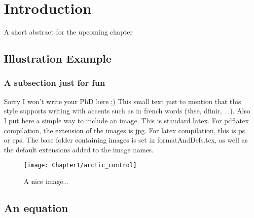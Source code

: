 \chapter{Introduction}
\label{chap:intro}
\begin{shortAbstract}
A short abstract for the upcoming chapter
\end{shortAbstract}


\section{Illustration Example}

\subsection{A subsection just for fun}

Sorry I won't write your PhD here ;) This small text just to mention that this style supports writing with accents such as in french words (thse, dfinir, ...). Also I put here a simple way to include an image. This is standard latex. For pdflatex compilation, the extension of the images is jpg. For latex compilation, this is ps or eps. The base folder containing images is set in formatAndDefs.tex, as well as the default extensions added to the image names.

\begin{figure}[!htbp]
  \begin{center}
    \texttt{[image: Chapter1/arctic\_control]}
  \end{center}
  \caption{A nice image...}
  \label{fig:jolieImage}
\end{figure}

\section{An equation}

